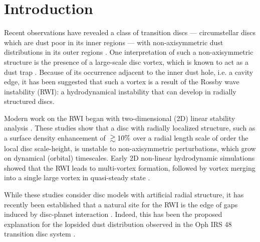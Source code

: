 \documentclass[useAMS,usenatbib]{mn2e}
\newcommand{\gtrsim}{\;\raisebox{-.8ex}{$\buildrel{\textstyle>}\over\sim$}\;}
\begin{document}
\section{Introduction}\label{intro}


Recent observations have revealed a class of transition discs ---
circumstellar discs which are dust poor in its inner regions ---  
with non-axisymmetric dust distributions in its outer 
regions \citep{brown09,mayama12,marel13,isella13}.  
One interpretation of such a non-axisymmetric structure is the presence of
a large-scale disc vortex, which is known to act as a dust trap
\citep{barge95,inaba06,birnstiel13,ataiee13,lyra13}.  
Because of its occurrence adjacent to the inner dust
hole, i.e. a cavity edge, it has been suggested that such a vortex is
a result of the Rossby wave instability (RWI): a hydrodynamical instability
that can develop in radially structured discs. 

Modern work on the RWI began with two-dimensional (2D) linear
stability analysis \citep{lovelace99,li00}. These studies show that a
disc with radially localized 
structure, such as a surface density enhancement of $\gtrsim 10\%$ over a
radial length scale of order the local disc scale-height, is unstable to
non-axisymmetric perturbations, which grow on dynamical (orbital)
timescales. Early 2D non-linear hydrodynamic simulations showed that
the RWI leads to multi-vortex formation, followed by vortex merging into
a single large vortex in quasi-steady state \citep{li01,inaba06}. 

While these studies consider disc models with artificial radial
structure, it has recently been established that a natural site for
the RWI is the edge of gaps induced by disc-planet interaction 
\citep{koller03,li05,valborro07,li09,lyra09b,lin10,lin11a}. Indeed, this has
been the proposed explanation for the lopsided dust distribution
observed in the Oph IRS 48 transition disc system
\citep{marel13}. %
\end{document}
